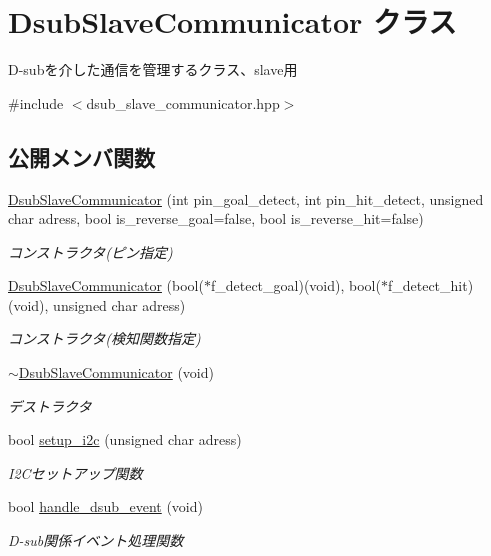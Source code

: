 \hypertarget{class_dsub_slave_communicator}{}\section{Dsub\+Slave\+Communicator クラス}
\label{class_dsub_slave_communicator}


D-\/subを介した通信を管理するクラス、slave用  




{\ttfamily \#include $<$dsub\+\_\+slave\+\_\+communicator.\+hpp$>$}

\subsection*{公開メンバ関数}
\begin{DoxyCompactItemize}
\item 
\mbox{\hyperlink{class_dsub_slave_communicator_ad9cb5bf6b10c80a5f03b2e34e2bf4f9f}{Dsub\+Slave\+Communicator}} (int pin\+\_\+goal\+\_\+detect, int pin\+\_\+hit\+\_\+detect, unsigned char adress, bool is\+\_\+reverse\+\_\+goal=false, bool is\+\_\+reverse\+\_\+hit=false)
\begin{DoxyCompactList}\small\item\em コンストラクタ(ピン指定) \end{DoxyCompactList}\item 
\mbox{\hyperlink{class_dsub_slave_communicator_abb4687cb61c76c24e9a2bac26e5fff40}{Dsub\+Slave\+Communicator}} (bool($\ast$f\+\_\+detect\+\_\+goal)(void), bool($\ast$f\+\_\+detect\+\_\+hit)(void), unsigned char adress)
\begin{DoxyCompactList}\small\item\em コンストラクタ(検知関数指定) \end{DoxyCompactList}\item 
\mbox{\hyperlink{class_dsub_slave_communicator_af3369086cde883a07f686203a41aab13}{$\sim$\+Dsub\+Slave\+Communicator}} (void)
\begin{DoxyCompactList}\small\item\em デストラクタ \end{DoxyCompactList}\item 
bool \mbox{\hyperlink{class_dsub_slave_communicator_a38614c9732f810200a8429dd4bac88aa}{setup\+\_\+i2c}} (unsigned char adress)
\begin{DoxyCompactList}\small\item\em I2\+Cセットアップ関数 \end{DoxyCompactList}\item 
bool \mbox{\hyperlink{class_dsub_slave_communicator_aef578741915e2e109b7b4d7813693cfe}{handle\+\_\+dsub\+\_\+event}} (void)
\begin{DoxyCompactList}\small\item\em D-\/sub関係イベント処理関数 \end{DoxyCompactList}\end{DoxyCompactItemize}
